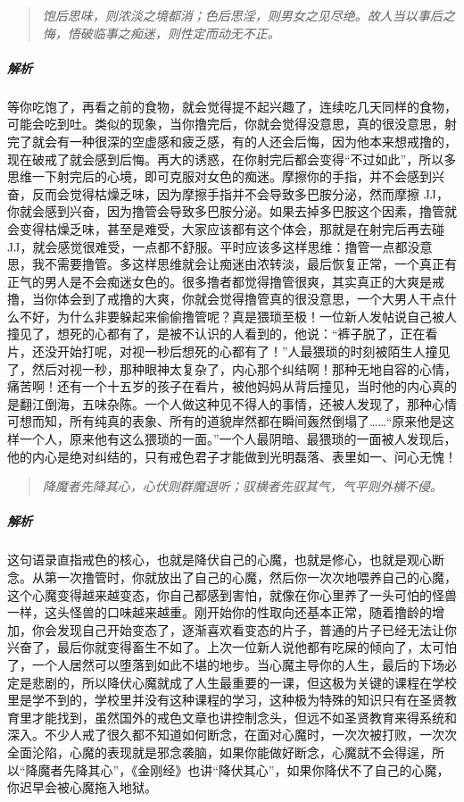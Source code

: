 \begin{quote}\it
    饱后思味，则浓淡之境都消；色后思淫，则男女之见尽绝。故人当以事后之悔，悟破临事之痴迷，则性定而动无不正。
\end{quote}

\subparagraph{解析} 等你吃饱了，再看之前的食物，就会觉得提不起兴趣了，连续吃几天同样的食物，可能会吃到吐。类似的现象，当你撸完后，你就会觉得没意思，真的很没意思，射完了就会有一种很深的空虚感和疲乏感，有的人还会后悔，因为他本来想戒撸的，现在破戒了就会感到后悔。再大的诱惑，在你射完后都会变得“不过如此”，所以多思维一下射完后的心境，即可克服对女色的痴迷。摩擦你的手指，并不会感到兴奋，反而会觉得枯燥乏味，因为摩擦手指并不会导致多巴胺分泌，然而摩擦 JJ，你就会感到兴奋，因为撸管会导致多巴胺分泌。如果去掉多巴胺这个因素，撸管就会变得枯燥乏味，甚至是难受，大家应该都有这个体会，那就是在射完后再去碰 JJ，就会感觉很难受，一点都不舒服。平时应该多这样思维：撸管一点都没意思，我不需要撸管。多这样思维就会让痴迷由浓转淡，最后恢复正常，一个真正有正气的男人是不会痴迷女色的。很多撸者都觉得撸管很爽，其实真正的大爽是戒撸，当你体会到了戒撸的大爽，你就会觉得撸管真的很没意思，一个大男人干点什么不好，为什么非要躲起来偷偷撸管呢？真是猥琐至极！一位新人发帖说自己被人撞见了，想死的心都有了，是被不认识的人看到的，他说：“裤子脱了，正在看片，还没开始打呢，对视一秒后想死的心都有了！”人最猥琐的时刻被陌生人撞见了，然后对视一秒，那种眼神太复杂了，内心那个纠结啊！那种无地自容的心情，痛苦啊！还有一个十五岁的孩子在看片，被他妈妈从背后撞见，当时他的内心真的是翻江倒海，五味杂陈。一个人做这种见不得人的事情，还被人发现了，那种心情可想而知，所有纯真的表象、所有的道貌岸然都在瞬间轰然倒塌了……“原来他是这样一个人，原来他有这么猥琐的一面。”一个人最阴暗、最猥琐的一面被人发现后，他的内心是绝对纠结的，只有戒色君子才能做到光明磊落、表里如一、问心无愧！

\begin{quote}\it
    降魔者先降其心，心伏则群魔退听；驭横者先驭其气，气平则外横不侵。
\end{quote}

\subparagraph{解析} 这句语录直指戒色的核心，也就是降伏自己的心魔，也就是修心，也就是观心断念。从第一次撸管时，你就放出了自己的心魔，然后你一次次地喂养自己的心魔，这个心魔变得越来越变态，你自己都感到害怕，就像在你心里养了一头可怕的怪兽一样，这头怪兽的口味越来越重。刚开始你的性取向还基本正常，随着撸龄的增加，你会发现自己开始变态了，逐渐喜欢看变态的片子，普通的片子已经无法让你兴奋了，最后你就变得畜生不如了。上次一位新人说他都有吃屎的倾向了，太可怕了，一个人居然可以堕落到如此不堪的地步。当心魔主导你的人生，最后的下场必定是悲剧的，所以降伏心魔就成了人生最重要的一课，但这极为关键的课程在学校里是学不到的，学校里并没有这种课程的学习，这种极为特殊的知识只有在圣贤教育里才能找到，虽然国外的戒色文章也讲控制念头，但远不如圣贤教育来得系统和深入。不少人戒了很久都不知道如何断念，在面对心魔时，一次次被打败，一次次全面沦陷，心魔的表现就是邪念袭脑，如果你能做好断念，心魔就不会得逞，所以“降魔者先降其心”，《金刚经》也讲“降伏其心”，如果你降伏不了自己的心魔，你迟早会被心魔拖入地狱。

